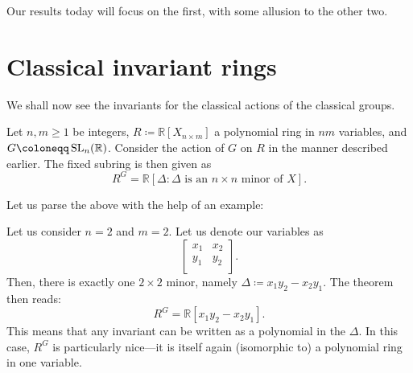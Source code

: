 \documentclass[12pt]{article}
\begin{document}
	Our results today will focus on the first, with some allusion to the other two.

\section{Classical invariant rings}

	We shall now see the invariants for the classical actions of the classical groups. 

	\begin{thm}
		Let $n, m \ge 1$ be integers, 
		$R \coloneqq \mathbb{R}[X_{n \times m}]$ a polynomial ring in $n m$ variables, 
		and $G \coloneqq \SL_{n}(\mathbb{R})$. 
		Consider the action of $G$ on $R$ in the manner described earlier. 
		The fixed subring is then given as
		\begin{equation*} 
			R^{G} = \mathbb{R}[\Delta : \Delta \text{ is an $n \times n$ minor of $X$}].
		\end{equation*}
	\end{thm}

	Let us parse the above with the help of an example:

	\begin{ex}
		Let us consider $n = 2$ and $m = 2$. 
		Let us denote our variables as
		\begin{equation*} 
			\begin{bmatrix}
				x_{1} & x_{2} \\
				y_{1} & y_{2} \\
			\end{bmatrix}.
		\end{equation*}
		Then, there is exactly one $2 \times 2$ minor, 
		namely $\Delta \coloneqq x_{1} y_{2} - x_{2} y_{1}$. 
		The theorem then reads:
		\begin{equation*} 
			R^{G} = \mathbb{R}[x_{1} y_{2} - x_{2} y_{1}].
		\end{equation*}
		This means that any invariant can be written as a polynomial in the $\Delta$. 
		In this case, $R^{G}$ is particularly nice---it is itself again (isomorphic to) a polynomial ring in one variable.
	\end{ex}
\end{document}

